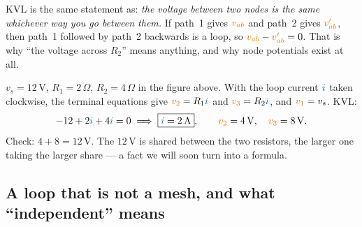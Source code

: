 \documentclass[11pt,a4paper]{article}
\newcommand{\Icol}[1]{\textcolor{ccur}{#1}}
\newcommand{\Vcol}[1]{\textcolor{cvolt}{#1}}
\newcommand{\uni}[1]{\,\mathrm{#1}}
\newcommand{\A}{\uni{A}}   \newcommand{\V}{\uni{V}}
\newcommand{\ohm}{\,\Omega}
\begin{document}
\begin{ideabox}
KVL is the same statement as: \emph{the voltage between two nodes is the same whichever
way you go between them.} If path~1 gives $\Vcol{v_{ab}}$ and path~2 gives
$\Vcol{v'_{ab}}$, then path~1 followed by path~2 backwards is a loop, so
$\Vcol{v_{ab}} - \Vcol{v'_{ab}} = 0$. That is why ``the voltage across $R_2$'' means
anything, and why node potentials exist at all.
\end{ideabox}

\begin{examplebox}
$v_s = 12\V$, $R_1 = 2\ohm$, $R_2 = 4\ohm$ in the figure above. With the loop current
$\Icol{i}$ taken clockwise, the terminal equations give
$\Vcol{v_2} = R_1 \Icol{i}$ and $\Vcol{v_3} = R_2 \Icol{i}$, and $\Vcol{v_1} = v_s$. KVL:
\[
  -12 + 2\Icol{i} + 4\Icol{i} = 0
  \;\Longrightarrow\;
  \boxed{\Icol{i} = 2\A}, \qquad \Vcol{v_2} = 4\V, \quad \Vcol{v_3} = 8\V .
\]
Check: $4 + 8 = 12\V$. The $12\V$ is shared between the two resistors, the larger one
taking the larger share --- a fact we will soon turn into a formula.
\end{examplebox}

\subsection{A loop that is not a mesh, and what ``independent'' means}
\end{document}
